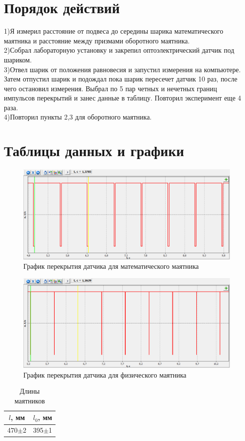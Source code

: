 \documentclass[13pt]{article}
\begin{document}
	\section{Порядок действий}
	1)Я измерил расстояние от подвеса до середины шарика математического маятника и расстояние между призмами оборотного маятника.\\
	2)Собрал лабораторную установку и закрепил оптоэлектрический датчик под шариком.\\
	3)Отвел шарик от положения равновесия и запустил измерения на компьютере. Затем отпустил шарик и подождал пока шарик пересечет датчик 10 раз, после чего остановил измерения. Выбрал по 5 пар четных и нечетных границ импульсов перекрытий и занес данные в таблицу. Повторил эксперимент еще 4 раза.\\
	4)Повторил пункты 2,3 для оборотного маятника.
	\section{Таблицы данных и графики}
	\begin{figure}[h]
		\centering
		\includegraphics[scale=1.5]{graph1}
		\caption{График перекрытия датчика для математического маятника}
	\end{figure}
		\begin{figure}[h]
		\centering
		\includegraphics[scale=1.5]{graph2}
		\caption{График перекрытия датчика для физического маятника}
	\end{figure}
	\begin{table}[h]
		\caption{Длины маятников}
		\centering
		\begin{tabular}{|c|c|}
			\hline
			$l$, мм&$l_0$, мм\\
			\hline
			470$\pm$2&395$\pm$1\\
			\hline
		\end{tabular}
	\end{table}
	
\end{document}

